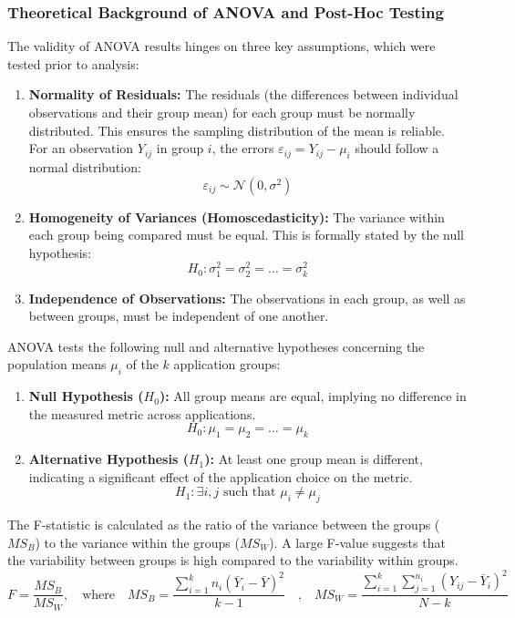 \documentclass[a4paper,12pt]{report}
\begin{document}
\subsubsection{Theoretical Background of ANOVA and Post-Hoc Testing}
The validity of ANOVA results hinges on three key assumptions, which were tested prior to analysis:
\begin{enumerate}[label=\roman*.]
    \item \textbf{Normality of Residuals:} The residuals (the differences between individual observations and their group mean) for each group must be normally distributed. This ensures the sampling distribution of the mean is reliable. For an observation \( Y_{ij} \) in group \(i\), the errors \( \varepsilon_{ij} = Y_{ij} - \mu_i \) should follow a normal distribution:
    $$ \varepsilon_{ij} \sim \mathcal{N}(0, \sigma^2) $$
    \item \textbf{Homogeneity of Variances (Homoscedasticity):} The variance within each group being compared must be equal. This is formally stated by the null hypothesis:
    $$ H_0: \sigma^2_1 = \sigma^2_2 = \dots = \sigma^2_k $$
    \item \textbf{Independence of Observations:} The observations in each group, as well as between groups, must be independent of one another.
\end{enumerate}


ANOVA tests the following null and alternative hypotheses concerning the population means \( \mu_i \) of the \( k \) application groups:
\begin{enumerate}[label=\roman*.]
    \item \textbf{Null Hypothesis ($H_0$):} All group means are equal, implying no difference in the measured metric across applications.
    $$ H_0: \mu_1 = \mu_2 = \dots = \mu_k $$
    \item \textbf{Alternative Hypothesis ($H_1$):} At least one group mean is different, indicating a significant effect of the application choice on the metric.
    $$ H_1: \exists i, j \text{ such that } \mu_i \neq \mu_j $$
\end{enumerate}
The F-statistic is calculated as the ratio of the variance between the groups ($MS_B$) to the variance within the groups ($MS_W$). A large F-value suggests that the variability between groups is high compared to the variability within groups.
$$
F = \frac{MS_B}{MS_W}, \quad \text{where} \quad MS_B = \frac{\sum_{i=1}^k n_i (\bar{Y}_i - \bar{Y})^2}{k-1} \quad \text{,} \quad MS_W = \frac{\sum_{i=1}^k \sum_{j=1}^{n_i} (Y_{ij} - \bar{Y}_i)^2}{N - k}
$$
\end{document}
